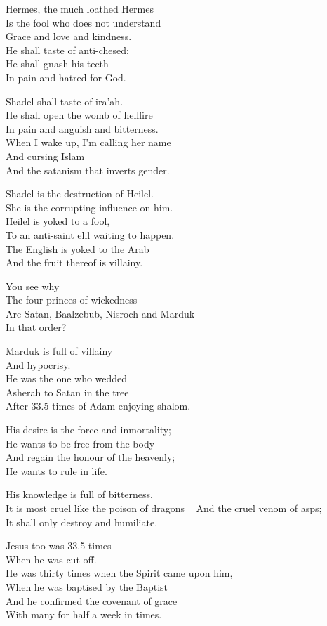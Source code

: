 \documentclass[
]{book}
\begin{document}
Hermes, the much loathed Hermes\\
Is the fool who does not understand\\
Grace and love and kindness.\\
He shall taste of anti-chesed;\\
He shall gnash his teeth\\
In pain and hatred for God.

Shadel shall taste of ira'ah.\\
He shall open the womb of hellfire\\
In pain and anguish and bitterness.\\
When I wake up, I'm calling her name\\
And cursing Islam\\
And the satanism that inverts gender.

Shadel is the destruction of Heilel.\\
She is the corrupting influence on him.\\
Heilel is yoked to a fool,\\
To an anti-saint elil waiting to happen.\\
The English is yoked to the Arab\\
And the fruit thereof is villainy.

You see why\\
The four princes of wickedness\\
Are Satan, Baalzebub, Nisroch and Marduk\\
In that order?

Marduk is full of villainy\\
And hypocrisy.\\
He was the one who wedded\\
Asherah to Satan in the tree\\
After 33.5 times of Adam enjoying shalom.

His desire is the force and inmortality;\\
He wants to be free from the body\\
And regain the honour of the heavenly;\\
He wants to rule in life.

His knowledge is full of bitterness.\\
It is most cruel like the poison of dragons ~
And the cruel venom of asps;\\
It shall only destroy and humiliate.

Jesus too was 33.5 times\\
When he was cut off.\\
He was thirty times when the Spirit came upon him,\\
When he was baptised by the Baptist\\
And he confirmed the covenant of grace\\
With many for half a week in times.
\end{document}
